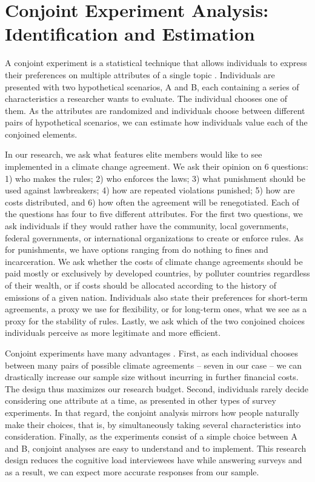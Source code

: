 \documentclass[12pt,a4paper,]{article}
\begin{document}
\hypertarget{conjoint-experiment-analysis-identification-and-estimation}{%
\section{\texorpdfstring{Conjoint Experiment Analysis: Identification
and Estimation
\label{sec:conjoint}}{Conjoint Experiment Analysis: Identification and Estimation }}\label{conjoint-experiment-analysis-identification-and-estimation}}

A conjoint experiment is a statistical technique that allows individuals
to express their preferences on multiple attributes of a single topic
\citep{hainmueller2014causal, bansak2016economic}. Individuals are
presented with two hypothetical scenarios, A and B, each containing a
series of characteristics a researcher wants to evaluate. The individual
chooses one of them. As the attributes are randomized and individuals
choose between different pairs of hypothetical scenarios, we can
estimate how individuals value each of the conjoined elements.

In our research, we ask what features elite members would like to see
implemented in a climate change agreement. We ask their opinion on 6
questions: 1) who makes the rules; 2) who enforces the laws; 3) what
punishment should be used against lawbreakers; 4) how are repeated
violations punished; 5) how are costs distributed, and 6) how often the
agreement will be renegotiated. Each of the questions has four to five
different attributes. For the first two questions, we ask individuals if
they would rather have the community, local governments, federal
governments, or international organizations to create or enforce rules.
As for punishments, we have options ranging from do nothing to fines and
incarceration. We ask whether the costs of climate change agreements
should be paid mostly or exclusively by developed countries, by polluter
countries regardless of their wealth, or if costs should be allocated
according to the history of emissions of a given nation. Individuals
also state their preferences for short-term agreements, a proxy we use
for flexibility, or for long-term ones, what we see as a proxy for the
stability of rules. Lastly, we ask which of the two conjoined choices
individuals perceive as more legitimate and more efficient.

Conjoint experiments have many advantages \citep{hainmueller2014causal}.
First, as each individual chooses between many pairs of possible climate
agreements -- seven in our case -- we can drastically increase our
sample size without incurring in further financial costs. The design
thus maximizes our research budget. Second, individuals rarely decide
considering one attribute at a time, as presented in other types of
survey experiments. In that regard, the conjoint analysis mirrors how
people naturally make their choices, that is, by simultaneously taking
several characteristics into consideration. Finally, as the experiments
consist of a simple choice between A and B, conjoint analyses are easy
to understand and to implement. This research design reduces the
cognitive load interviewees have while answering surveys and as a
result, we can expect more accurate responses from our sample.
\end{document}
